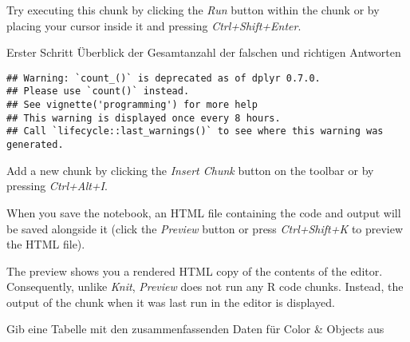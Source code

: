 \documentclass[
]{article}
\newenvironment{Shaded}{\begin{snugshade}}{\end{snugshade}}
\newcommand{\DataTypeTok}[1]{\textcolor[rgb]{0.13,0.29,0.53}{#1}}
\newcommand{\DecValTok}[1]{\textcolor[rgb]{0.00,0.00,0.81}{#1}}
\newcommand{\KeywordTok}[1]{\textcolor[rgb]{0.13,0.29,0.53}{\textbf{#1}}}
\newcommand{\NormalTok}[1]{#1}
\newcommand{\OperatorTok}[1]{\textcolor[rgb]{0.81,0.36,0.00}{\textbf{#1}}}
\newcommand{\StringTok}[1]{\textcolor[rgb]{0.31,0.60,0.02}{#1}}
\begin{document}
Try executing this chunk by clicking the \emph{Run} button within the
chunk or by placing your cursor inside it and pressing
\emph{Ctrl+Shift+Enter}.

Erster Schritt Überblick der Gesamtanzahl der falschen und richtigen
Antworten

\begin{verbatim}
## Warning: `count_()` is deprecated as of dplyr 0.7.0.
## Please use `count()` instead.
## See vignette('programming') for more help
## This warning is displayed once every 8 hours.
## Call `lifecycle::last_warnings()` to see where this warning was generated.
\end{verbatim}

Add a new chunk by clicking the \emph{Insert Chunk} button on the
toolbar or by pressing \emph{Ctrl+Alt+I}.

When you save the notebook, an HTML file containing the code and output
will be saved alongside it (click the \emph{Preview} button or press
\emph{Ctrl+Shift+K} to preview the HTML file).

The preview shows you a rendered HTML copy of the contents of the
editor. Consequently, unlike \emph{Knit}, \emph{Preview} does not run
any R code chunks. Instead, the output of the chunk when it was last run
in the editor is displayed.

Gib eine Tabelle mit den zusammenfassenden Daten für Color \& Objects
aus

\begin{Shaded}
\end{Shaded}
\end{document}
